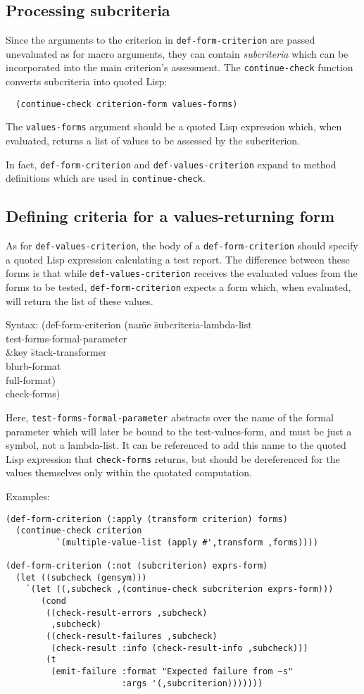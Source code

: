 \subsection{Processing subcriteria}
Since the arguments to the criterion in \texttt{def-form-criterion}
are passed unevaluated as for macro arguments, they can contain
\emph{subcriteria} which can be incorporated into the main criterion's
assessment.  The \texttt{continue-check} function converts subcriteria
into quoted Lisp:
\begin{verbatim}
  (continue-check criterion-form values-forms)
\end{verbatim}
The \texttt{values-forms} argument should be a quoted Lisp expression
which, when evaluated, returns a list of values to be assessed by the
subcriterion.

In fact, \texttt{def-form-criterion} and \texttt{def-values-criterion}
expand to method definitions which are used in \texttt{continue-check}.

\subsection{Defining criteria for a values-returning form}
As for \texttt{def-values-criterion}, the body of a
\texttt{def-form-criterion} should specify a quoted Lisp expression
calculating a test report.  The difference between these forms is that
while \texttt{def-values-criterion} receives the evaluated values from
the forms to be tested, \texttt{def-form-criterion} expects a form
which, when evaluated, will return the list of these values.
%
{\ttfamily\begin{tabbing}
\textrm{Syntax: 
}(de\=f-form-criterion (na\=me \=subcriteria-lambda-list
\\ \>\> \> test-forms-formal-parameter
\\ \>\> \&key \=stack-transformer
\\ \>\> \> blurb-format
\\ \>\> \> full-format)
\\ \> check-forms)
\end{tabbing}}
%
Here, \texttt{test-forms-formal-parameter} abstracts over the name of
the formal parameter which will later be bound to the
test-values-form, and must be just a symbol, not a lambda-list.  It
can be referenced to add this name to the quoted Lisp expression that
\texttt{check-forms} returns, but should be dereferenced for the
values themselves only within the quotated computation.

Examples:
\begin{verbatim}
(def-form-criterion (:apply (transform criterion) forms)
  (continue-check criterion
		  `(multiple-value-list (apply #',transform ,forms))))

(def-form-criterion (:not (subcriterion) exprs-form)
  (let ((subcheck (gensym)))
    `(let ((,subcheck ,(continue-check subcriterion exprs-form)))
       (cond
        ((check-result-errors ,subcheck)
         ,subcheck)
        ((check-result-failures ,subcheck)
         (check-result :info (check-result-info ,subcheck)))
        (t
         (emit-failure :format "Expected failure from ~s"
                       :args '(,subcriterion)))))))
\end{verbatim}

